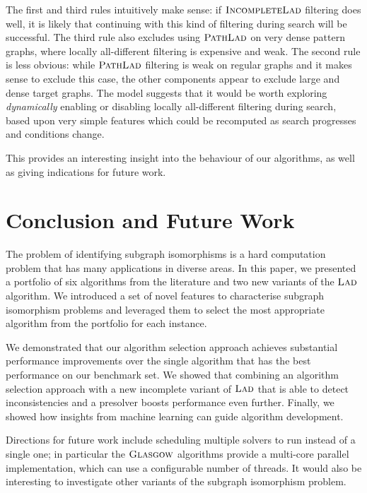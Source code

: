 \documentclass{llncs}
\newcommand{\Glasgow}{$\textsc{Glasgow}$\xspace}
\newcommand{\LAD}{$\textsc{Lad}$\xspace}
\newcommand{\IncompleteLAD}{$\textsc{IncompleteLad}$\xspace}
\newcommand{\PathLAD}{$\textsc{PathLad}$\xspace}
\begin{document}
\noindent
The first and third rules intuitively make sense: if \IncompleteLAD
filtering does well, it is likely that continuing with this kind of filtering
during search will be successful. The third rule also excludes using \PathLAD
on very dense pattern graphs, where locally all-different filtering is
expensive and weak. The second rule is less obvious: while \PathLAD filtering is
weak on regular graphs and it makes sense to exclude this case, the other
components appear to exclude large and dense target graphs. The model suggests
that it would be worth exploring \emph{dynamically} enabling or disabling
locally all-different filtering during search, based upon very simple features
which could be recomputed as search progresses and conditions change.

This provides an interesting insight into the behaviour of our algorithms, as
well as giving indications for future work.

\section{Conclusion and Future Work}\label{sec:concs}

The problem of identifying subgraph isomorphisms is a hard computation problem that has many
applications in diverse areas. In this paper, we presented a portfolio of six algorithms from the
literature and two new variants of the \LAD algorithm. We introduced a set of novel features to
characterise subgraph isomorphism problems and leveraged them to select the most appropriate
algorithm from the portfolio for each instance.

We demonstrated that our algorithm selection approach achieves substantial
performance improvements over the single algorithm that has the best performance
on our benchmark set. We showed that combining an algorithm selection approach
with a new incomplete variant of \LAD that is able to detect inconsistencies
and a presolver boosts performance even further. Finally, we showed how
insights from machine learning can guide algorithm development.

Directions for future work include scheduling multiple solvers to run instead of
a single one; in particular the \Glasgow algorithms provide a multi-core
parallel implementation, which can use a configurable number of threads. It
would also be interesting to investigate other variants of the subgraph
isomorphism problem.



\end{document}
